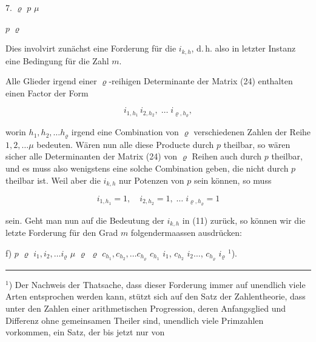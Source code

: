 
7.  $\varrho$  $p$
 $\mu$


 $p$ 
$\varrho$ 

Dies involvirt zun\"achst eine Forderung f\"ur die $i_{k,h}$, d.\,h. also
in letzter Instanz eine Bedingung f\"ur die Zahl $m$.

Alle Glieder irgend einer $\varrho$-reihigen Determinante der Matrix (24)
enthalten einen Factor der Form

\[
i_{1,h_1}\,i_{2,h_2}, \; \dots \; i_{\varrho,h_\varrho},
\]

worin $h_1, h_2, \dots h_\varrho$ irgend eine Combination von $\varrho$
verschiedenen Zahlen der Reihe $1, 2, \dots \mu$ bedeuten. W\"aren nun alle
diese Producte durch $p$ theilbar, so w\"aren sicher alle Determinanten der
Matrix (24) von $\varrho$ Reihen auch durch $p$ theilbar, und es muss also
wenigstens eine solche Combination geben, die nicht durch $p$ theilbar ist.
Weil aber die $i_{k,h}$ nur Potenzen von $p$ sein k\"onnen, so muss

\[
i_{1,h_1} = 1, \quad i_{2,h_2} = 1, \; \dots \; i_{\varrho,h_\varrho} = 1
\]

sein. Geht man nun auf die Bedeutung der $i_{k,h}$ in (11) zur\"uck, so
k\"onnen wir die letzte Forderung f\"ur den Grad $m$ folgendermaassen
ausdr\"ucken:

f)  $p$  $\varrho$
 $i_1, i_2, \dots i_\varrho$  $\mu$ 
$\varrho$  $\varrho$  $c_{h_1}, c_{h_2}, \dots c_{h_\varrho}$  $c_{h_1}$  $i_1$, $c_{h_2}$
 $i_2 \dots$, $c_{h_\varrho}$  $i_\varrho$
 $^1$).

\noindent\rule{4cm}{0.4pt}

\footnotesize
$^1$) Der Nachweis der Thatsache, dass dieser Forderung immer auf
unendlich viele Arten entsprochen werden kann, st\"utzt sich auf den Satz
der Zahlentheorie, dass unter den Zahlen einer arithmetischen Progression,
deren Anfangsglied und Differenz ohne gemeinsamen Theiler sind, unendlich
viele Primzahlen vorkommen, ein Satz, der bis jetzt nur von
\normalsize
